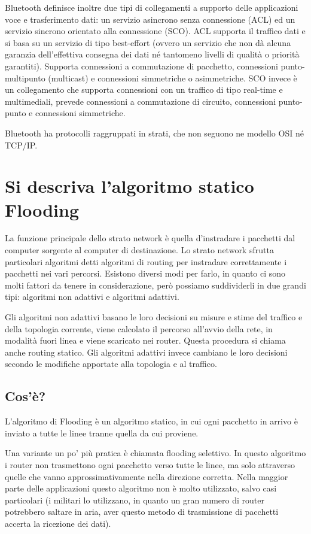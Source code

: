 Bluetooth definisce inoltre due tipi di collegamenti a supporto delle applicazioni voce e trasferimento dati: un servizio asincrono senza connessione (ACL) ed un servizio sincrono orientato alla connessione (SCO).
ACL supporta il traffico dati e si basa su un servizio di tipo best-effort (ovvero un servizio che non dà alcuna garanzia dell'effettiva consegna dei dati né tantomeno livelli di qualità o priorità garantiti).
Supporta connessioni a commutazione di pacchetto, connessioni punto-multipunto (multicast) e connessioni simmetriche o asimmetriche.
SCO invece è un collegamento che supporta connessioni con un traffico di tipo real-time e multimediali, prevede connessioni a commutazione di circuito, connessioni punto-punto e connessioni simmetriche.

Bluetooth ha protocolli raggruppati in strati, che non seguono ne modello OSI né TCP/IP.

\section{Si descriva l'algoritmo statico Flooding}

La funzione principale dello strato network è quella d'instradare i pacchetti dal computer sorgente al computer di destinazione.
Lo strato network sfrutta particolari algoritmi detti algoritmi di routing per instradare correttamente i pacchetti nei vari percorsi. Esistono diversi modi per farlo, in quanto ci sono molti fattori da tenere in considerazione, però possiamo suddividerli in due grandi tipi: algoritmi non adattivi e algoritmi adattivi.

Gli algoritmi non adattivi basano le loro decisioni su misure e stime del traffico e della topologia corrente, viene calcolato il percorso all'avvio della rete, in modalità fuori linea e viene scaricato nei router. Questa procedura si chiama anche routing statico. Gli algoritmi adattivi invece cambiano le loro decisioni secondo le modifiche apportate alla topologia e al traffico.
\subsection{Cos'è?}
L'algoritmo di Flooding è un algoritmo statico, in cui ogni pacchetto in arrivo è inviato a tutte le linee tranne quella da cui proviene.

Una variante un po' più pratica è chiamata flooding selettivo. In questo algoritmo i router non trasmettono ogni pacchetto verso tutte le linee, ma solo attraverso quelle che vanno approssimativamente nella direzione corretta.
Nella maggior parte delle applicazioni questo algoritmo non è molto utilizzato, salvo casi particolari (i militari lo utilizzano, in quanto un gran numero di router potrebbero saltare in aria, aver questo metodo di trasmissione di pacchetti accerta la ricezione dei dati).

